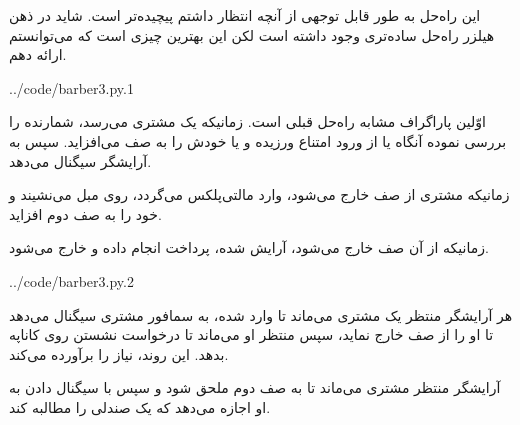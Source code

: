 \documentclass{book}
\begin{document}
    این راه‌حل به طور قابل توجهی از آنچه انتظار داشتم پیچیده‌تر است. شاید در ذهن هیلزر راه‌حل ساده‌تری وجود داشته است لکن 
    این بهترین چیزی است که می‌توانستم ارائه دهم. 

\begin{latin}
%

{../code/barber3.py.1}
\end{latin}

    اوّلین پاراگراف مشابه راه‌حل قبلی است. زمانیکه یک مشتری می‌رسد، شمارنده را بررسی نموده آنگاه یا از ورود امتناع ورزیده و یا خودش را به 
    صف می‌افزاید. سپس به آرایشگر سیگنال می‌دهد. 

    زمانیکه مشتری از صف خارج می‌شود، وارد مالتی‌پلکس می‌گردد، روی مبل می‌نشیند و خود را به صف دوم افزاید. 

    زمانیکه از آن صف خارج می‌شود، آرایش شده، پرداخت انجام داده و خارج می‌شود.

\begin{latin}
%

{../code/barber3.py.2}
\end{latin}


    هر آرایشگر منتظر یک مشتری می‌ماند تا وارد شده، به سمافور مشتری سیگنال می‌دهد تا او را از صف خارج نماید، سپس منتظر او می‌ماند 
    تا درخواست نشستن روی کاناپه بدهد. این روند، نیاز  را برآورده می‌کند.

    آرایشگر منتظر مشتری می‌ماند تا به صف دوم ملحق شود و سپس با سیگنال دادن به او اجازه می‌دهد که یک صندلی را مطالبه کند. 
\end{document}
